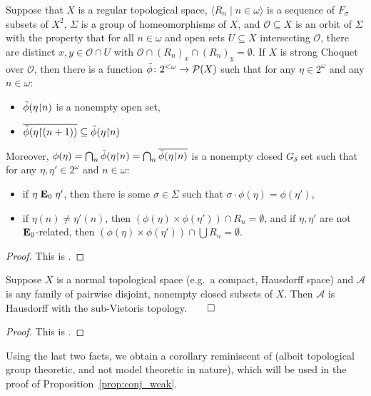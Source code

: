 	
	\begin{fct}
		\label{fct:dtmtoolu}
		Suppose that $X$ is a regular topological space, $\langle R_n\mid n\in \omega\rangle$ is a sequence of $F_\sigma$ subsets of $X^2$, $\Sigma$ is a group of homeomorphisms of $X$, and $\mathcal O\subseteq X$ is an orbit of $\Sigma$ with the property that for all $n\in \omega$ and open sets $U\subseteq X$ intersecting $\mathcal O$, there are distinct $x,y\in\mathcal O\cap U$ with $\mathcal O\cap (R_n)_x\cap (R_n)_y=\emptyset$. If $X$ is strong Choquet over $\mathcal O$, then there is a function $\tilde\phi\colon 2^{<\omega}\to {\mathcal P}(X)$ such that for any $\eta\in 2^\omega$ and any $n\in \omega$:
		\begin{itemize}
			\item
			$\tilde\phi(\eta\mathord{\upharpoonright} n)$ is a nonempty open set,
			\item
			$\overline{\tilde\phi(\eta\mathord{\upharpoonright}{(n+1)})}\subseteq \tilde\phi(\eta\mathord{\upharpoonright}{n})$
		\end{itemize}
		Moreover, $\phi(\eta)=\bigcap_n \tilde\phi(\eta\mathord{\upharpoonright} n)=\bigcap_n \overline{\tilde\phi(\eta\mathord{\upharpoonright} n)}$ is a nonempty closed $G_\delta$ set such that for any $\eta,\eta'\in 2^\omega$ and $n\in\omega$:
		\begin{itemize}
			\item
			if $\eta \mathrel{ { {\mathbf E}_0 } } \eta'$, then there is some $\sigma\in\Sigma$ such that $\sigma\cdot \phi(\eta)=\phi(\eta')$,
			\item
			if $\eta(n)\neq \eta'(n)$, then $(\phi(\eta)\times \phi(\eta'))\cap R_n=\emptyset$, and if $\eta,\eta'$ are not $\mathrel{ { {\mathbf E}_0 } }$-related, then $(\phi(\eta)\times \phi(\eta'))\cap \bigcup R_n=\emptyset$.
		\end{itemize}
	\end{fct}
	\begin{proof}
		This is \cite[Theorem 3.14]{KR16}.
	\end{proof}
	
	
	\begin{fct}
		\label{fct:subVt}
		Suppose $X$ is a normal topological space (e.g.\ a compact, Hausdorff space) and $\mathcal A$ is any family of pairwise disjoint, nonempty closed subsets of $X$. Then $\mathcal A$ is Hausdorff with the sub-Vietoris topology.$\qed$
	\end{fct}
	\begin{proof}
		This is \cite[Proposition 3.16]{KR16}.
	\end{proof}
	
	Using the last two facts, we obtain a corollary reminiscent of \cite[Theorem 3.18]{KR16} (albeit topological group theoretic, and not model theoretic in nature), which will be used in the proof of Proposition~\ref{prop:conj_weak}.
	
